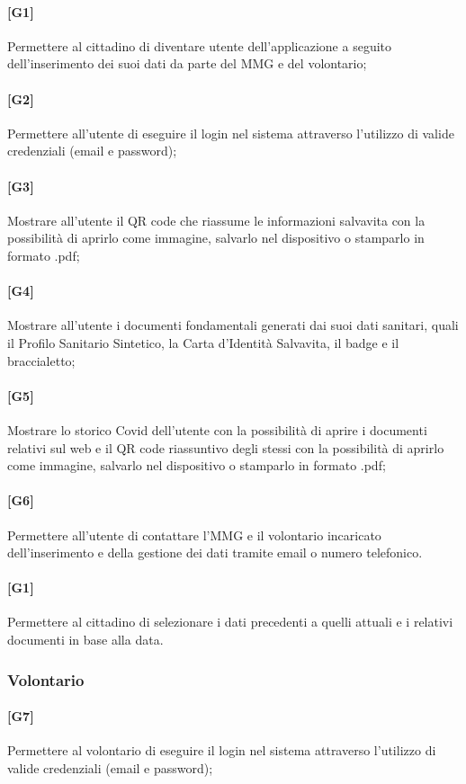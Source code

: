 \documentclass[12pt,a4paper,twoside,openright,titlepage]{book}
\begin{document}
\paragraph{[G1]} Permettere al cittadino di diventare utente dell'applicazione a seguito dell'inserimento dei suoi dati da parte del MMG e del volontario;
\paragraph{[G2]} Permettere all'utente di eseguire il login nel sistema attraverso l'utilizzo di valide credenziali (email e password);
\paragraph{[G3]} Mostrare all'utente il QR code che riassume le informazioni salvavita con la possibilità di aprirlo come immagine, salvarlo nel dispositivo o stamparlo in formato .pdf;
\paragraph{[G4]} Mostrare all'utente i documenti fondamentali generati dai suoi dati sanitari, quali il Profilo Sanitario Sintetico, la Carta d'Identità Salvavita, il badge e il braccialetto;
\paragraph{[G5]} Mostrare lo storico Covid dell'utente con la possibilità di aprire i documenti relativi sul web e il QR code riassuntivo degli stessi con la possibilità di aprirlo come immagine, salvarlo nel dispositivo o stamparlo in formato .pdf;
\paragraph{[G6]} Permettere all'utente di contattare l'MMG e il volontario incaricato dell'inserimento e della gestione dei dati tramite email o numero telefonico.
\paragraph{[G1]} Permettere al cittadino di selezionare i dati precedenti a quelli attuali e i relativi documenti in base alla data.

\subsubsection{Volontario}
\paragraph{[G7]} Permettere al volontario di eseguire il login nel sistema attraverso l'utilizzo di valide credenziali (email e password);
\end{document}
